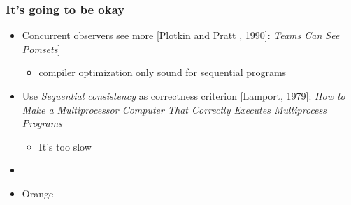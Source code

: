 \documentclass[t,aspectratio=169]{beamer} %
\begin{document}
\begin{frame}
  \frametitle{It's going to be okay}
  \begin{itemize}[<+->]
  \item Concurrent observers see more [Plotkin and Pratt , 1990]: \emph{Teams
      Can See Pomsets}]
    \begin{itemize}
    \item compiler optimization only sound for sequential programs      
    \end{itemize}
  \item Use \emph{Sequential consistency} as correctness criterion [Lamport,
    1979]: \emph{How to Make a Multiprocessor Computer That Correctly
      Executes Multiprocess Programs}
    \begin{itemize}
    \item It's too slow
    \end{itemize}
  \item 
  \item Orange
  \end{itemize}
\end{frame}






\begin{frame}
\end{frame}
\end{document}
